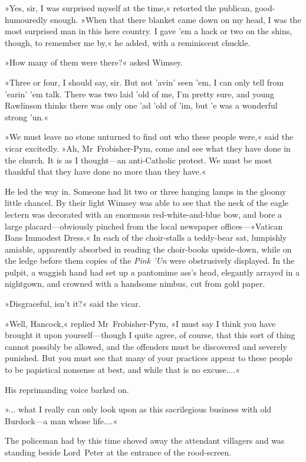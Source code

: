»Yes, sir, I was surprised myself at the time,« retorted the publican, good-humouredly enough. »When that there blanket came down on my head, I was the most surprised man in this here country. I gave 'em a hack or two on the shins, though, to remember me by,« he added, with a reminiscent chuckle.

»How many of them were there?« asked Wimsey.

»Three or four, I should say, sir. But not 'avin' seen 'em, I can only tell from 'earin' 'em talk. There was two laid 'old of me, I'm pretty sure, and young Rawlinson thinks there was only one 'ad 'old of 'im, but 'e was a wonderful strong 'un.«

»We must leave no stone unturned to find out who these people were,« said the vicar excitedly. »Ah, Mr~Frobisher-Pym, come and see what they have done in the church. It is as I thought—an anti-Catholic protest. We must be most thankful that they have done no more than they have.«

He led the way in. Someone had lit two or three hanging lamps in the gloomy little chancel. By their light Wimsey was able to see that the neck of the eagle lectern was decorated with an enormous red-white-and-blue bow, and bore a large placard—obviously pinched from the local newspaper offices—»Vatican Bans Immodest Dress.« In each of the choir-stalls a teddy-bear sat, lumpishly amiable, apparently absorbed in reading the choir-books upside-down, while on the ledge before them copies of the \textit{Pink 'Un} were obstrusively displayed. In the pulpit, a waggish hand had set up a pantomime ass's head, elegantly arrayed in a nightgown, and crowned with a handsome nimbus, cut from gold paper.

»Disgraceful, isn't it?« said the vicar.

»Well, Hancock,« replied Mr~Frobisher-Pym, »I must say I think you have brought it upon yourself—though I quite agree, of course, that this sort of thing cannot possibly be allowed, and the offenders must be discovered and severely punished. But you must see that many of your practices appear to these people to be papistical nonsense at best, and while that is no excuse....«

His reprimanding voice barked on.

»... what I really can only look upon as this sacrilegious business with old Burdock—a man whose life....«

The policeman had by this time shoved away the attendant villagers and was standing beside Lord~Peter at the entrance of the rood-screen.

